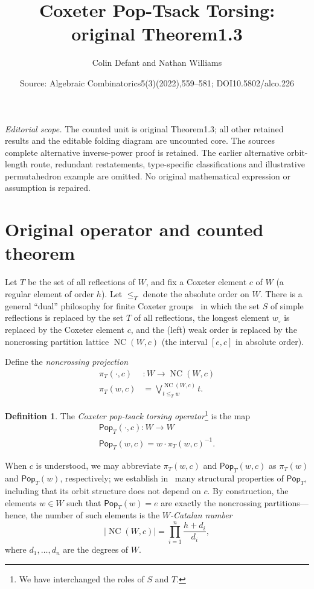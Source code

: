 \documentclass[10pt,a4paper]{amsart}
\title[Coxeter inverse-element pop-tsack orbit]{Coxeter Pop-Tsack Torsing: original Theorem1.3}
\author{Colin Defant and Nathan Williams}
\date{Source: Algebraic Combinatorics5(3)(2022),559--581; DOI10.5802/alco.226}
\theoremstyle{definition}
\newtheorem{defi}[defi]{Definition}
\newcommand{\darkblue}{\color{darkblue}}
\newcommand{\defn}[1]{\emph{\darkblue #1}}
\newcommand{\pop}{\mathsf{Pop}}
\newcommand{\wo}{w_\circ}
\DeclareMathOperator{\NC}{NC}
\begin{document}
\maketitle
\noindent\textit{Editorial scope.} The counted unit is original Theorem1.3; all other retained results and the editable folding diagram are uncounted core. The source\textquotesingle s complete alternative inverse-power proof is retained. The earlier alternative orbit-length route, redundant restatements, type-specific classifications and illustrative permutahedron example are omitted. No original mathematical expression or assumption is repaired.
\section{Original operator and counted theorem}
\setcounter{equation}{2}
Let $T$ be the set of all reflections of $W$, and fix a Coxeter element $c$ of $W$ (a regular element of order $h$).  Let $\leq_T$ denote the absolute order on $W$. There is a general ``dual'' philosophy for finite Coxeter groups~\cite{bessis2003dual} in which the set $S$ of simple reflections is replaced by the set $T$ of all reflections, the longest element $\wo$ is replaced by the Coxeter element $c$, and the (left) weak order is replaced by the noncrossing partition lattice $\NC(W,c)$ (the interval $[e,c]$ in absolute order).

Define the \defn{noncrossing projection}
\begin{align}\label{EqNCProj}
\pi_T(\cdot,c)&:W \to \NC(W,c) \nonumber\\
\pi_T(w,c) &= \bigvee_{t \leq_T w}^{\NC(W,c)} t.
\end{align}

\setcounter{theorem}{1}
\begin{defi}
\label{def:dual_pop_stack}
The \defn{Coxeter pop-tsack torsing operator}\footnote{We have interchanged the roles of $S$ and $T$.} is the map
\begin{gather*}
 \pop_T(\cdot,c):W\to W \nonumber \\
\pop_T(w,c) = w \cdot \pi_T(w,c)^{-1}.
\end{gather*}
\end{defi}

When $c$ is understood, we may abbreviate $\pi_T(w,c)$ and $\pop_T(w,c)$ as $\pi_T(w)$ and $\pop_T(w)$, respectively; we establish in~ many structural properties of $\pop_T$, including that its orbit structure does not depend on $c$.  
By construction, the elements $w\in W$ such that $\pop_T(w)=e$ are exactly the noncrossing partitions---hence, the number of such elements is the \defn{$W$-Catalan number} 
\[
\left|\NC(W,c)\right|=\prod_{i=1}^n \frac{h+d_i}{d_i},
\]
 where $d_1,\ldots,d_n$ are the degrees of $W$.
\end{document}
